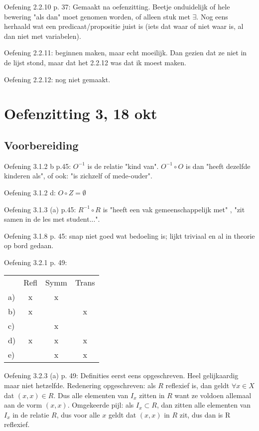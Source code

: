 \documentclass{article}
\begin{document}
Oefening 2.2.10 p. 37: Gemaakt na oefenzitting. Beetje onduidelijk of hele bewering "als dan" moet genomen worden, of alleen stuk met $\exists$. Nog eens herhaald wat een predicaat/propositie juist is (iets dat waar of niet waar is, al dan niet met variabelen). 

Oefening 2.2.11: beginnen maken, maar echt moeilijk. Dan gezien dat ze niet in de lijst stond, maar dat het 2.2.12 was dat ik moest maken. 

Oefening 2.2.12: nog niet gemaakt. 


\section*{Oefenzitting 3, 18 okt}

\subsection*{Voorbereiding}

Oefening 3.1.2 b p.45: $O^{-1}$ is de relatie "kind van". $O^{-1} \circ O$ is dan "heeft dezelfde kinderen als", of ook: "is zichzelf of mede-ouder".  

Oefening 3.1.2 d: $O \circ Z = \emptyset$

Oefening 3.1.3 (a) p.45: $R^{-1} \circ R$ is "heeft een vak gemeenschappelijk met" , "zit samen in de les met student...". 

Oefening 3.1.8 p. 45: snap niet goed wat bedoeling is; lijkt triviaal en al in theorie op bord gedaan. 

Oefening 3.2.1 p. 49: 

\begin{tabular}{l|c|c|c}
   & Refl & Symm & Trans\\
a) & x   &   x   &   \\
b) & x   &       & x \\
c) &     &   x   &   \\
d) & x   &   x   & x \\
e) &     &   x   & x \\
\end{tabular}

Oefening 3.2.3 (a) p. 49: 
Definities eerst eens opgeschreven. Heel gelijkaardig maar niet hetzelfde. 
Redenering opgeschreven: als $R$ reflexief is, dan geldt $\forall x \in X$ dat $(x,x) \in R$. Dus alle elementen van $I_x$ zitten in $R$ want ze voldoen allemaal aan de vorm $(x,x)$. 
Omgekeerde pijl: als $I_x \subset R$, dan zitten alle elementen van $I_x$ in de relatie $R$, dus voor alle $x$ geldt dat $(x,x)$ in $R$ zit, dus dan is R reflexief. 
\end{document}
